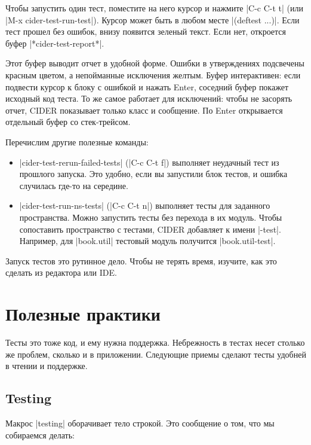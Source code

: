 Чтобы запустить один тест, поместите на него курсор и нажмите \spverb|C-c C-t t|
(или \spverb|M-x cider-test-run-test|). Курсор может быть в любом месте
\spverb|(deftest ...)|. Если тест прошел без ошибок, внизу появится зеленый
текст. Если нет, откроется буфер \spverb|*cider-test-report*|.

Этот буфер выводит отчет в удобной форме. Ошибки в утверждениях подсвечены
красным цветом, а непойманные исключения желтым. Буфер интерактивен: если
подвести курсор к блоку с ошибкой и нажать Enter, соседний буфер покажет
исходный код теста. То же самое работает для исключений: чтобы не засорять
отчет, CIDER показывает только класс и сообщение. По Enter открывается отдельный
буфер со стек-трейсом.

Перечислим другие полезные команды:

\begin{itemize}

\item
  \spverb|cider-test-rerun-failed-tests| (\spverb|C-c C-t f|) выполняет
  неудачный тест из прошлого запуска. Это удобно, если вы запустили блок тестов,
  и ошибка случилась где-то на середине.

\item
  \spverb|cider-test-run-ns-tests| (\spverb|C-c C-t n|) выполняет тесты для
  заданного пространства. Можно запустить тесты без перехода в их модуль. Чтобы
  сопоставить пространство с тестами, CIDER добавляет к имени
  \spverb|-test|. Например, для \spverb|book.util| тестовый модуль получится
  \spverb|book.util-test|.

\end{itemize}

Запуск тестов это рутинное дело. Чтобы не терять время, изучите, как это сделать
из редактора или IDE.

\section{Полезные практики}

Тесты это тоже код, и ему нужна поддержка. Небрежность в тестах несет столько же
проблем, сколько и в приложении. Следующие приемы сделают тесты удобней в чтении
и поддержке.

\subsection{Testing}

Макрос \spverb|testing| оборачивает тело строкой. Это сообщение о том, что мы
собираемся делать:

